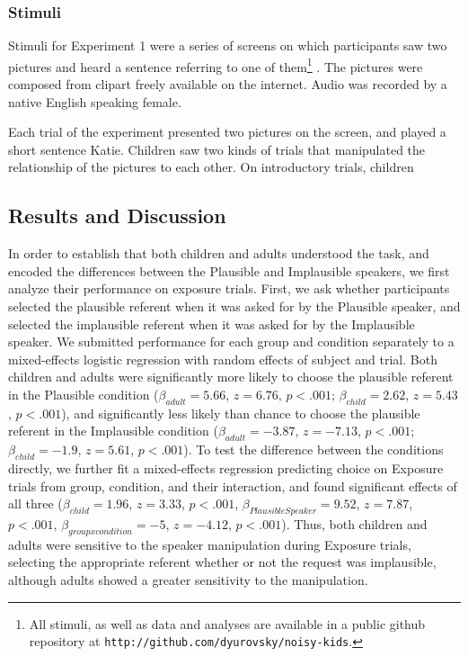 \documentclass[man,floatsintext]{apa6}
\begin{document}
\subsubsection{Stimuli}

Stimuli for Experiment 1 were a series of screens on which participants saw two pictures and heard a sentence referring to one of them\footnote{All stimuli, as well as data and analyses are available in a public github repository at \small{\tt{http://github.com/dyurovsky/noisy-kids}}.} . The pictures were composed from clipart freely available on the internet. Audio was recorded by a native English speaking female. 


Each trial of the experiment presented two pictures on the screen, and played a short sentence Katie. Children saw two kinds of trials that manipulated the relationship of the pictures to each other. On introductory trials, children 

\subsection{Results and Discussion}

In order to establish that both children and adults understood the task, and encoded the differences between the Plausible and Implausible speakers, we first analyze their performance on exposure trials. First, we ask whether participants selected the plausible referent when it was asked for by the Plausible speaker, and selected the implausible referent when it was asked for by the Implausible speaker. We submitted performance for each group and condition separately to a mixed-effects logistic regression with random effects of subject and trial. Both children and adults were significantly more likely to choose the plausible referent in the Plausible condition ($\beta_{adult} = 5.66$, $z = 6.76$, $p <.001$; $\beta_{child} = 2.62$, $z = 5.43$, $p <.001$), and significantly less likely than chance to choose the plausible referent in the Implausible condition ($\beta_{adult} = -3.87$, $z = -7.13$, $p <.001$; $\beta_{child} = -1.9$, $z = 5.61$, $p <.001$). To test the difference between the conditions directly, we further fit a mixed-effects regression predicting choice on Exposure trials from group, condition, and their interaction, and found significant effects of all three ($\beta_{child} = 1.96$,  $z = 3.33$, $p <.001$, $\beta_{Plausible Speaker} = 9.52$,  $z = 7.87$, $p <.001$,  $\beta_{group x condition} = -5$,  $z = -4.12$, $p <.001$). Thus, both children and adults were sensitive to the speaker manipulation during Exposure trials, selecting the appropriate referent whether or not the request was implausible, although adults showed a greater sensitivity to the manipulation.
\end{document}
